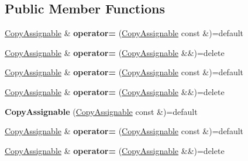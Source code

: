 \subsection*{Public Member Functions}
\begin{DoxyCompactItemize}
\item 
\mbox{\label{struct_copy_assignable_a82d221cd5a8d0f7476a64a75af3469f1}} 
\mbox{\hyperlink{struct_copy_assignable}{Copy\+Assignable}} \& {\bfseries operator=} (\mbox{\hyperlink{struct_copy_assignable}{Copy\+Assignable}} const \&)=default
\item 
\mbox{\label{struct_copy_assignable_ab66c66b8310e0a1b43d524d42bffa9b3}} 
\mbox{\hyperlink{struct_copy_assignable}{Copy\+Assignable}} \& {\bfseries operator=} (\mbox{\hyperlink{struct_copy_assignable}{Copy\+Assignable}} \&\&)=delete
\item 
\mbox{\label{struct_copy_assignable_a82d221cd5a8d0f7476a64a75af3469f1}} 
\mbox{\hyperlink{struct_copy_assignable}{Copy\+Assignable}} \& {\bfseries operator=} (\mbox{\hyperlink{struct_copy_assignable}{Copy\+Assignable}} const \&)=default
\item 
\mbox{\label{struct_copy_assignable_ab66c66b8310e0a1b43d524d42bffa9b3}} 
\mbox{\hyperlink{struct_copy_assignable}{Copy\+Assignable}} \& {\bfseries operator=} (\mbox{\hyperlink{struct_copy_assignable}{Copy\+Assignable}} \&\&)=delete
\item 
\mbox{\label{struct_copy_assignable_a77034526b31d054e1c8739fdc443e440}} 
{\bfseries Copy\+Assignable} (\mbox{\hyperlink{struct_copy_assignable}{Copy\+Assignable}} const \&)=default
\item 
\mbox{\label{struct_copy_assignable_a82d221cd5a8d0f7476a64a75af3469f1}} 
\mbox{\hyperlink{struct_copy_assignable}{Copy\+Assignable}} \& {\bfseries operator=} (\mbox{\hyperlink{struct_copy_assignable}{Copy\+Assignable}} const \&)=default
\item 
\mbox{\label{struct_copy_assignable_ab66c66b8310e0a1b43d524d42bffa9b3}} 
\mbox{\hyperlink{struct_copy_assignable}{Copy\+Assignable}} \& {\bfseries operator=} (\mbox{\hyperlink{struct_copy_assignable}{Copy\+Assignable}} \&\&)=delete

\end{DoxyCompactItemize}
